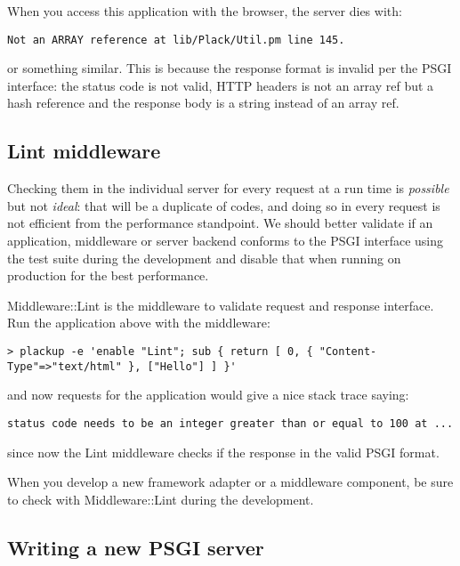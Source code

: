 When you access this application with the browser, the server dies with:

\begin{lstlisting}
Not an ARRAY reference at lib/Plack/Util.pm line 145.
\end{lstlisting}

or something similar. This is because the response format is invalid per
the PSGI interface: the status code is not valid, HTTP headers is not an
array ref but a hash reference and the response body is a string instead
of an array ref.

\subsection{Lint middleware}\label{lint-middleware}

Checking them in the individual server for every request at a run time
is \emph{possible} but not \emph{ideal}: that will be a duplicate of
codes, and doing so in every request is not efficient from the
performance standpoint. We should better validate if an application,
middleware or server backend conforms to the PSGI interface using the
test suite during the development and disable that when running on
production for the best performance.

Middleware::Lint is the middleware to validate request and response
interface. Run the application above with the middleware:

\begin{lstlisting}
> plackup -e 'enable "Lint"; sub { return [ 0, { "Content-Type"=>"text/html" }, ["Hello"] ] }'
\end{lstlisting}

and now requests for the application would give a nice stack trace
saying:

\begin{lstlisting}
status code needs to be an integer greater than or equal to 100 at ...
\end{lstlisting}

since now the Lint middleware checks if the response in the valid PSGI
format.

When you develop a new framework adapter or a middleware component, be
sure to check with Middleware::Lint during the development.

\subsection{Writing a new PSGI server}\label{writing-a-new-psgi-server}

